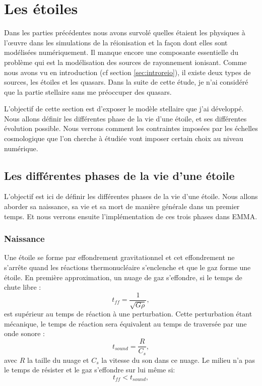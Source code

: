 \chapter{Les étoiles}
\label{sec:etoiles}

Dans les parties précédentes nous avons survolé quelles étaient les physiques à l’œuvre dans les simulations de la réionisation et la façon dont elles sont modélisées numériquement.
Il manque encore une composante essentielle du problème qui est la modélisation des sources de rayonnement ionisant.
Comme nous avons vu en introduction (cf section \ref{sec:introreio}), il existe deux types de sources, les étoiles et les quasars.
Dans la suite de cette étude, je n'ai considéré que la partie stellaire sans me préoccuper des quasars.

L'objectif de cette section est d'exposer le modèle stellaire que j'ai développé.
Nous allons définir les différentes phase de la vie d'une étoile, et ses différentes évolution possible.
Nous verrons comment les contraintes imposées par les échelles cosmologique que l'on cherche à étudiée vont imposer certain choix au niveau numérique.

\section{Les différentes phases de la vie d'une étoile}

L'objectif est ici de définir les différentes phases de la vie d'une étoile.
Nous allons aborder sa naissance, sa vie et sa mort de manière générale dans un premier temps.
Et nous verrons ensuite l'implémentation de ces trois phases dans EMMA.

\subsection{Naissance}


Une étoile se forme par effondrement gravitationnel et cet effondrement ne s'arrête quand les réactions thermonucléaire s'enclenche et que le gaz forme une étoile.
En première approximation, un nuage de gaz s'effondre, si le temps de chute libre : 
\begin{equation}
t_{ff} = \frac{1}{\sqrt{G \rho}},
\end{equation}
est supérieur au temps de réaction à une perturbation.
Cette perturbation étant mécanique, le temps de réaction sera équivalent au temps de traversée par une onde sonore :
 \begin{equation}
t_{sound} = \frac{R}{C_s},
\end{equation}
avec $R$ la taille du nuage et $C_s$ la vitesse du son dans ce nuage.
Le milieu n'a pas le temps de résister et le gaz s'effondre sur lui même si:
\begin{equation}
t_{ff} < t_{sound},
\end{equation}

